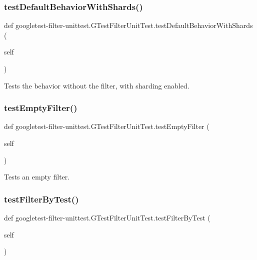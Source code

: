 \subsubsection{\texorpdfstring{testDefaultBehaviorWithShards()}{testDefaultBehaviorWithShards()}}
{\footnotesize\ttfamily def googletest-\/filter-\/unittest.\+G\+Test\+Filter\+Unit\+Test.\+test\+Default\+Behavior\+With\+Shards (\begin{DoxyParamCaption}\item[{}]{self }\end{DoxyParamCaption})}

\begin{DoxyVerb}Tests the behavior without the filter, with sharding enabled.\end{DoxyVerb}
 \mbox{\label{classgoogletest-filter-unittest_1_1_g_test_filter_unit_test_aeaa447047f82973a4ef02e20d5cb2d19}} 
\subsubsection{\texorpdfstring{testEmptyFilter()}{testEmptyFilter()}}
{\footnotesize\ttfamily def googletest-\/filter-\/unittest.\+G\+Test\+Filter\+Unit\+Test.\+test\+Empty\+Filter (\begin{DoxyParamCaption}\item[{}]{self }\end{DoxyParamCaption})}

\begin{DoxyVerb}Tests an empty filter.\end{DoxyVerb}
 \mbox{\label{classgoogletest-filter-unittest_1_1_g_test_filter_unit_test_a5665345aa2e94412fd65b19bc5077342}} 
\subsubsection{\texorpdfstring{testFilterByTest()}{testFilterByTest()}}
{\footnotesize\ttfamily def googletest-\/filter-\/unittest.\+G\+Test\+Filter\+Unit\+Test.\+test\+Filter\+By\+Test (\begin{DoxyParamCaption}\item[{}]{self }\end{DoxyParamCaption})}

